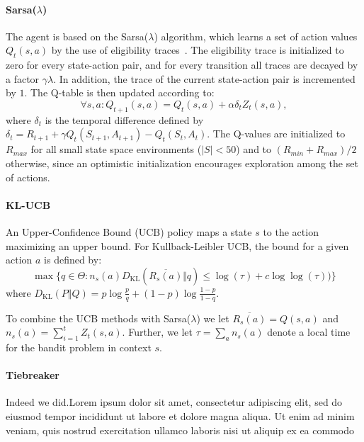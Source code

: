 
\paragraph{Sarsa($\lambda$)}
The agent is based on the Sarsa($\lambda$) algorithm, which learns a set of
action values $Q_t(s,a)$ by the use of eligibility
traces~\cite{Sutton:1998:IRL:551283}. The eligibility trace is initialized to
zero for every state-action pair, and for every transition all traces are
decayed by a factor $\gamma\lambda$. In addition, the trace of the current
state-action pair is incremented by $1$. The Q-table is then updated according
to:
\begin{equation}
        \forall s,a : Q_{t+1}(s,a) = Q_t(s,a) + \alpha\delta_t Z_t(s,a),
\end{equation}
where $\delta_t$ is the temporal difference defined by $\delta_t = R_{t+1} +
\gamma Q_t(S_{t+1},A_{t+1}) - Q_t(S_t,A_t)$. The Q-values are initialized to
$R_{max}$ for all small state space environments ($\vert{S}\vert < 50$) and to
$(R_{min}+R_{max})/2$ otherwise, since an optimistic initialization encourages
exploration among the set of actions.

\paragraph{KL-UCB}
An Upper-Confidence Bound (UCB) policy maps a state $s$ to the action maximizing
an upper bound. For Kullback-Leibler UCB, the bound for a given action $a$ is
defined by:
\begin{equation}
    \max\big\{q \in \Theta : n_s(a)
        D_{\mathrm{KL}}\left(\overline{R_s(a)}\Big\Vert{q}\right) \le \log(\tau) +
        c\log\log(\tau))\big\}
\end{equation}
where $D_\mathrm{KL}(P\Vert{Q}) = p \log
\frac{p}{q}+(1-p)\log\frac{1-p}{1-q}$.~\cite{DBLP:journals/jmlr/GarivierC11}

To combine the UCB methods with Sarsa($\lambda$) we let
$\overline{R_s(a)}=Q(s,a)$ and $n_s(a) = \sum_{i=1}^tZ_t(s,a)$. Further, we let
$\tau = \sum_a{n_s(a)}$ denote a local time for the bandit problem in context
$s$.


\paragraph{Tiebreaker}
Indeed we did.Lorem ipsum dolor sit amet, consectetur adipiscing elit, sed do
eiusmod tempor incididunt ut labore et dolore magna aliqua. Ut enim ad minim
veniam, quis nostrud exercitation ullamco laboris nisi ut aliquip ex ea commodo

